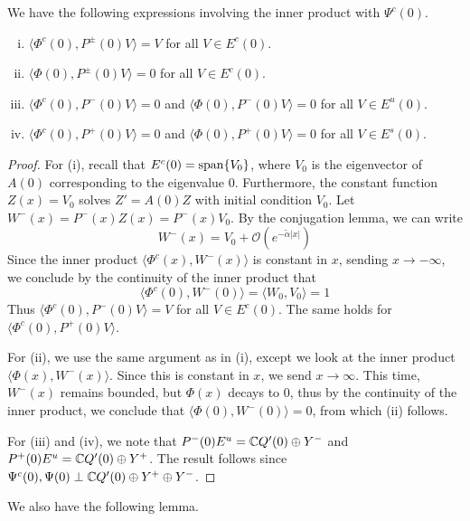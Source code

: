 \documentclass[thesis.tex]{subfiles}
\begin{document}
\begin{lemma}\label{PsiIP}
We have the following expressions involving the inner product with $\Psi^c(0)$.
\begin{enumerate}[(i)]
	\item $\langle \Phi^c(0), P^\pm(0) V \rangle = V$ for all $V \in E^c(0)$.
	\item $\langle \Phi(0), P^\pm(0) V \rangle = 0$ for all $V \in E^c(0)$.
	\item $\langle \Phi^c(0), P^-(0) V \rangle = 0$ and $\langle \Phi(0), P^-(0) V \rangle = 0$ for all $V \in E^u(0)$.
	\item $\langle \Phi^c(0), P^+(0) V \rangle = 0$ and $\langle \Phi(0), P^+(0) V \rangle = 0$ for all $V \in E^s(0)$.
\end{enumerate}
\begin{proof}
For (i), recall that $E^c(0) = \mathop\mathrm{span}\nolimits\{ V_0 \}$, where $V_0$ is the eigenvector of $A(0)$ corresponding to the eigenvalue 0. Furthermore, the constant function $Z(x) = V_0$ solves $Z' = A(0) Z$ with initial condition $V_0$. Let $W^-(x) = P^-(x) Z(x) = P^-(x) V_0$. By the conjugation lemma, we can write
\[
W^-(x) = V_0 + \mathcal{O}({e^{-\tilde{\alpha}|x|}})
\]
Since the inner product $\langle \Phi^c(x), W^-(x) \rangle$ is constant in $x$, sending $x \rightarrow -\infty$, we conclude by the continuity of the inner product that
\[
\langle \Phi^c(0), W^-(0) \rangle = \langle W_0, V_0 \rangle = 1 
\]
Thus $\langle \Phi^c(0), P^-(0) V \rangle = V$ for all $V \in E^c(0)$. The same holds for $\langle \Phi^c(0), P^+(0) V \rangle$.

For (ii), we use the same argument as in (i), except we look at the inner product $\langle \Phi(x), W^-(x) \rangle$. Since this is constant in $x$, we send $x \rightarrow \infty$. This time, $W^-(x)$ remains bounded, but $\Phi(x)$ decays to 0, thus by the continuity of the inner product, we conclude that $\langle \Phi(0), W^-(0) \rangle = 0$, from which (ii) follows.

For (iii) and (iv), we note that $P^-(0)E^u = \mathbb{C} Q'(0) \oplus Y^-$ and $P^+(0)E^u = \mathbb{C} Q'(0) \oplus Y^+$. The result follows since $\Psi^c(0), \Psi(0) \perp \mathbb{C} Q'(0) \oplus Y^+ \oplus Y^-$.
\end{proof}
\end{lemma}

We also have the following lemma.
\end{document}
